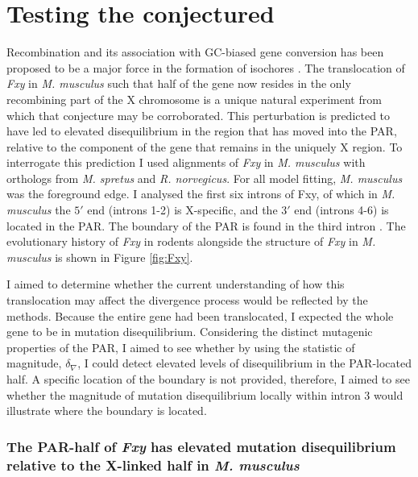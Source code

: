 \section{Testing the conjectured}

Recombination and its association with GC-biased gene conversion has been proposed to be a major force in the formation of isochores \citep{Montoya-Burgos2003RecombinationGenomes}. The translocation of \textit{Fxy} in \textit{M. musculus} such that half of the gene now resides in the only recombining part of the X chromosome is a unique natural experiment from which that conjecture may be corroborated. This perturbation is predicted to have led to elevated disequilibrium in the region that has moved into the PAR, relative to the component of the gene that remains in the uniquely X region. To interrogate this prediction I used alignments of \textit{Fxy} in \textit{M. musculus} with orthologs from \textit{M. spretus} and \textit{R. norvegicus}. For all model fitting, \textit{M. musculus} was the foreground edge. I analysed the first six introns of Fxy, of which in \textit{M. musculus} the $5'$ end (introns 1-2) is X-specific, and the $3'$ end (introns 4-6) is located in the PAR. The boundary of the PAR is found in the third intron \citep{Palmer1997AMice}. The evolutionary history of \textit{Fxy} in rodents alongside the structure of \textit{Fxy} in \textit{M. musculus} is shown in Figure \ref{fig:Fxy}. 

I aimed to determine whether the current understanding of how this translocation may affect the divergence process would be  reflected by the methods. Because the entire gene had been translocated, I expected the whole gene to be in mutation disequilibrium. Considering the distinct mutagenic properties of the PAR, I aimed to see whether by using the statistic of magnitude, $\delta_\nabla$, I could detect elevated levels of disequilibrium in the PAR-located half. A specific location of the boundary is not provided, therefore, I aimed to see whether the magnitude of mutation disequilibrium locally within intron 3 would illustrate where the boundary is located. 



\subsubsection{The PAR-half of \textit{Fxy} has elevated mutation disequilibrium relative to the X-linked half in \textit{M. musculus}}


